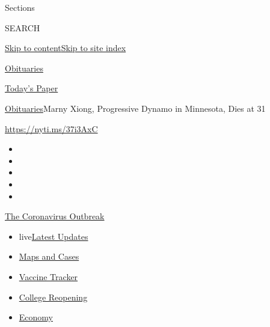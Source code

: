 Sections

SEARCH

\protect\hyperlink{site-content}{Skip to
content}\protect\hyperlink{site-index}{Skip to site index}

\href{https://www.nytimes.com/section/obituaries}{Obituaries}

\href{https://myaccount.nytimes.com/auth/login?response_type=cookie\&client_id=vi}{}

\href{https://www.nytimes.com/section/todayspaper}{Today's Paper}

\href{/section/obituaries}{Obituaries}\textbar{}Marny Xiong, Progressive
Dynamo in Minnesota, Dies at 31

\url{https://nyti.ms/37i3AxC}

\begin{itemize}
\item
\item
\item
\item
\item
\end{itemize}

\href{https://www.nytimes.com/news-event/coronavirus?action=click\&pgtype=Article\&state=default\&region=TOP_BANNER\&context=storylines_menu}{The
Coronavirus Outbreak}

\begin{itemize}
\tightlist
\item
  live\href{https://www.nytimes.com/2020/08/03/world/coronavirus-covid-19.html?action=click\&pgtype=Article\&state=default\&region=TOP_BANNER\&context=storylines_menu}{Latest
  Updates}
\item
  \href{https://www.nytimes.com/interactive/2020/us/coronavirus-us-cases.html?action=click\&pgtype=Article\&state=default\&region=TOP_BANNER\&context=storylines_menu}{Maps
  and Cases}
\item
  \href{https://www.nytimes.com/interactive/2020/science/coronavirus-vaccine-tracker.html?action=click\&pgtype=Article\&state=default\&region=TOP_BANNER\&context=storylines_menu}{Vaccine
  Tracker}
\item
  \href{https://www.nytimes.com/2020/08/02/us/covid-college-reopening.html?action=click\&pgtype=Article\&state=default\&region=TOP_BANNER\&context=storylines_menu}{College
  Reopening}
\item
  \href{https://www.nytimes.com/live/2020/08/03/business/stock-market-today-coronavirus?action=click\&pgtype=Article\&state=default\&region=TOP_BANNER\&context=storylines_menu}{Economy}
\end{itemize}

